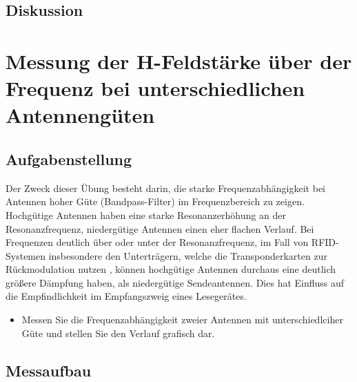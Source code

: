 \documentclass[12pt,a4paper,ngerman]{article}
\begin{document}
\subsection{Diskussion}


\pagebreak



\section{Messung der H-Feldstärke über der Frequenz bei unterschiedlichen Antennengüten}
\subsection{Aufgabenstellung}
Der Zweck dieser Übung besteht darin, die starke Frequenzabhängigkeit bei Antennen hoher Güte (Bandpass-Filter) im Frequenzbereich zu zeigen. Hochgütige Antennen haben eine starke Resonanzerhöhung an der Resonanzfrequenz, niedergütige Antennen einen eher flachen Verlauf. Bei Frequenzen deutlich über oder unter der Resonanzfrequenz, im Fall von RFID-Systemen insbesondere den Unterträgern, welche die Transponderkarten zur Rückmodulation nutzen , können hochgütige Antennen durchaus eine deutlich größere Dämpfung haben, als niedergütige Sendeantennen. Dies hat Einfluss auf die Empfindlichkeit im Empfangszweig eines Lesegerätes.
\begin{itemize}
\item Messen Sie die Frequenzabhängigkeit zweier Antennen mit unterschiedlciher Güte und stellen Sie den Verlauf grafisch dar.
\end{itemize}


\subsection{Messaufbau}
\end{document}
